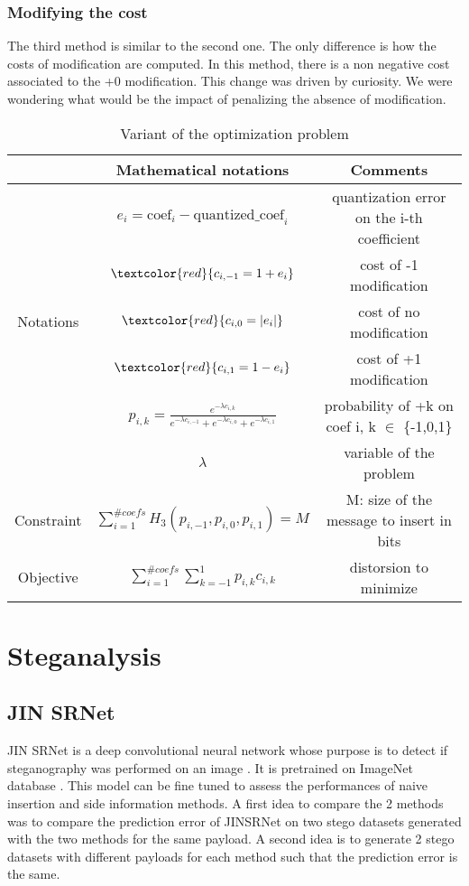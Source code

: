 \documentclass[12pt]{article}
\begin{document}
\subsubsection{Modifying the cost}
The third method is similar to the second one. The only difference is how the costs of modification are computed. In this method, there is a non negative cost associated to the +0 modification. This change was driven by curiosity. We were wondering what would be the impact of penalizing the absence of modification.
\begin{table}[H]
\begin{tabular}{ |c|c|c| }
    \hline
    & Mathematical notations & Comments\\
    \hline
    & $e_i = \text{coef}_i - \text{quantized\_coef}_i$ & quantization error on the i-th coefficient\\ 
    & $\textcolor{red}{c_{i,-1} = 1 + e_i}$ & cost of -1 modification\\ 
    Notations & $\textcolor{red}{c_{i,0} = |e_i|}$ & cost of no modification\\
    & $\textcolor{red}{c_{i,1} = 1 - e_i}$ & cost of +1 modification\\
    & $p_{i,k} = \frac{e^{-\lambda c_{i,k}}}{e^{-\lambda c_{i,-1}} + e^{-\lambda c_{i,0}} + e^{-\lambda c_{i,1}}}$ & probability of +k on coef i, k $\in$ \{-1,0,1\}\\
    & $\lambda$ & variable of the problem\\
    \hline
    Constraint & $\displaystyle\sum_{i=1}^{\# coefs}{H_3(p_{i,-1},p_{i,0},p_{i,1})} = M$ & M: size of the message to insert in bits\\
    \hline
    Objective & $\displaystyle\sum_{i=1}^{\# coefs}{\sum_{k=-1}^{1}{p_{i,k}c_{i,k}}}$ & distorsion to minimize \\ 
    \hline
\end{tabular}
\caption[Side information variant]{Variant of the optimization problem}
\end{table}

\section{Steganalysis}
\subsection{JIN SRNet}
JIN SRNet is a deep convolutional neural network whose purpose is to detect if steganography was performed on an image \autocite{liuLosslessImageSteganography2022}. It is pretrained on ImageNet database \autocite{butoraRevisitingPerturbedQuantization2021}. This model can be fine tuned to assess the performances of naive insertion and side information methods. A first idea to compare the 2 methods was to compare the prediction error of JINSRNet on two stego datasets generated with the two methods for the same payload. A second idea is to generate 2 stego datasets with different payloads for each method such that the prediction error is the same. 
\end{document}
